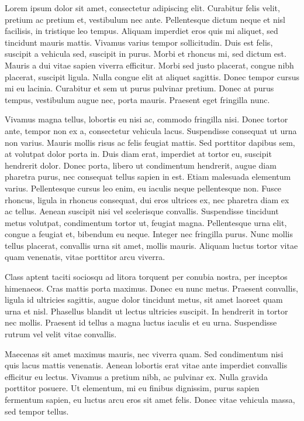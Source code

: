 Lorem ipsum dolor sit amet, consectetur adipiscing elit. Curabitur felis velit, pretium ac pretium et, vestibulum nec ante. Pellentesque dictum neque et nisl facilisis, in tristique leo tempus. Aliquam imperdiet eros quis mi aliquet, sed tincidunt mauris mattis. Vivamus varius tempor sollicitudin. Duis est felis, suscipit a vehicula sed, suscipit in purus. Morbi et rhoncus mi, sed dictum est. Mauris a dui vitae sapien viverra efficitur. Morbi sed justo placerat, congue nibh placerat, suscipit ligula. Nulla congue elit at aliquet sagittis. Donec tempor cursus mi eu lacinia. Curabitur et sem ut purus pulvinar pretium. Donec at purus tempus, vestibulum augue nec, porta mauris. Praesent eget fringilla nunc.

Vivamus magna tellus, lobortis eu nisi ac, commodo fringilla nisi. Donec tortor ante, tempor non ex a, consectetur vehicula lacus. Suspendisse consequat ut urna non varius. Mauris mollis risus ac felis feugiat mattis. Sed porttitor dapibus sem, at volutpat dolor porta in. Duis diam erat, imperdiet at tortor eu, suscipit hendrerit dolor. Donec porta, libero ut condimentum hendrerit, augue diam pharetra purus, nec consequat tellus sapien in est. Etiam malesuada elementum varius. Pellentesque cursus leo enim, eu iaculis neque pellentesque non. Fusce rhoncus, ligula in rhoncus consequat, dui eros ultrices ex, nec pharetra diam ex ac tellus. Aenean suscipit nisi vel scelerisque convallis. Suspendisse tincidunt metus volutpat, condimentum tortor ut, feugiat magna. Pellentesque urna elit, congue a feugiat et, bibendum eu neque. Integer nec fringilla purus. Nunc mollis tellus placerat, convallis urna sit amet, mollis mauris. Aliquam luctus tortor vitae quam venenatis, vitae porttitor arcu viverra.

Class aptent taciti sociosqu ad litora torquent per conubia nostra, per inceptos himenaeos. Cras mattis porta maximus. Donec eu nunc metus. Praesent convallis, ligula id ultricies sagittis, augue dolor tincidunt metus, sit amet laoreet quam urna et nisl. Phasellus blandit ut lectus ultricies suscipit. In hendrerit in tortor nec mollis. Praesent id tellus a magna luctus iaculis et eu urna. Suspendisse rutrum vel velit vitae convallis.

Maecenas sit amet maximus mauris, nec viverra quam. Sed condimentum nisi quis lacus mattis venenatis. Aenean lobortis erat vitae ante imperdiet convallis efficitur eu lectus. Vivamus a pretium nibh, ac pulvinar ex. Nulla gravida porttitor posuere. Ut elementum, mi eu finibus dignissim, purus sapien fermentum sapien, eu luctus arcu eros sit amet felis. Donec vitae vehicula massa, sed tempor tellus.

